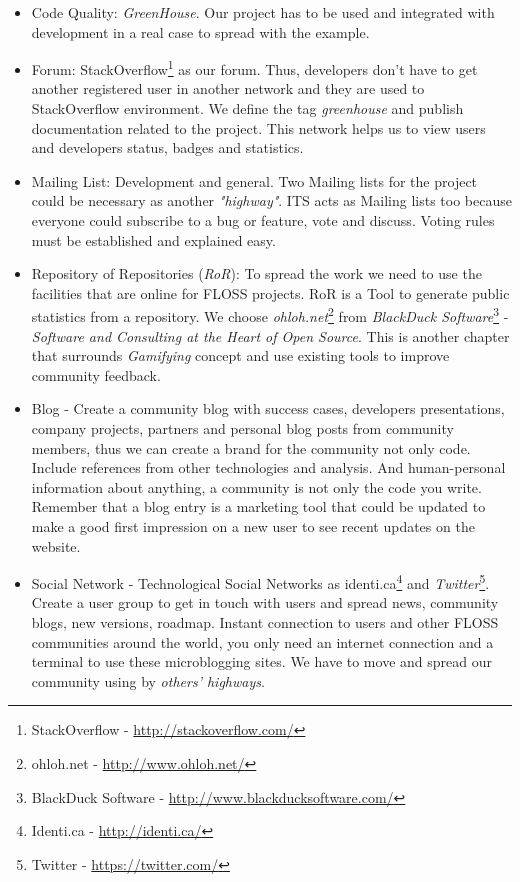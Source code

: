 \documentclass[11pt]{scrartcl}
\begin{document}
\begin{itemize}
	\item Code Quality: \emph{GreenHouse}. Our project has to be used and integrated with development in a real case to spread with the example.
	\item Forum: StackOverflow\footnote{StackOverflow - \url{http://stackoverflow.com/}} as our forum. Thus, developers don't have to get another registered user in another network and they are used to StackOverflow environment. We define the tag \emph{greenhouse} and publish documentation related to the project. This network helps us to view users and developers status, badges and statistics.
	\item Mailing List: Development and general. Two Mailing lists for the project could be necessary as another \emph{"highway"}. ITS acts as Mailing lists too because everyone could subscribe to a bug or feature, vote and discuss. Voting rules must be established and explained easy.
	\item Repository of Repositories (\emph{RoR}): To spread the work we need to use the facilities that are online for FLOSS projects. RoR is a Tool to generate public statistics from a repository. We choose \emph{ohloh.net}\footnote{ohloh.net - \url{http://www.ohloh.net/}} from \emph{BlackDuck Software}\footnote{BlackDuck Software - \url{http://www.blackducksoftware.com/}} - \emph{Software and Consulting at the Heart of Open Source}. This is another chapter that surrounds \emph{Gamifying} concept and use existing tools to improve community feedback.
	 \item Blog - Create a community blog with success cases, developers presentations, company projects, partners and personal blog posts from community members, thus we can create a brand for the community not only code. Include references from other technologies and analysis. And human-personal information about anything, a community is not only the code you write. Remember that a blog entry is a marketing tool that could be updated to make a good first impression on a new user to see recent updates on the website.
	 \item Social Network - Technological Social Networks as identi.ca\footnote{Identi.ca - \url{http://identi.ca/}} and \emph{Twitter}\footnote{Twitter - \url{https://twitter.com/}}. Create a user group to get in touch with users and spread news, community blogs, new versions, roadmap. Instant connection to users and other FLOSS communities around the world, you only need an internet connection and a terminal to use these microblogging sites. We have to move and spread our community using by \emph{others' highways}.

\end{itemize}
\end{document}
